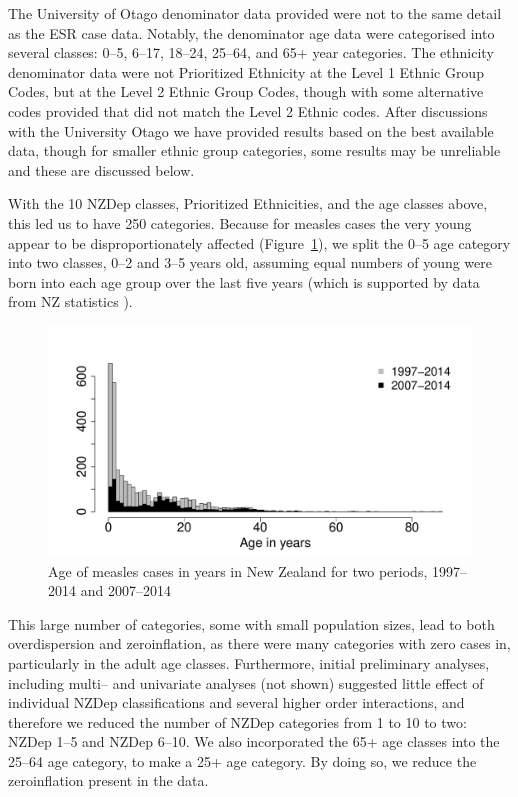 \documentclass{article}
\begin{document}
The University of Otago denominator data provided were not to the same detail as the ESR case data. Notably, the denominator age data were categorised into several classes: 0--5, 6--17, 18--24, 25--64, and 65+ year categories. The ethnicity denominator data were not Prioritized Ethnicity at the Level 1 Ethnic Group Codes, but at the Level 2 Ethnic Group Codes, though with some alternative codes provided that did not match the Level 2 Ethnic codes. After discussions with the University Otago we have provided results based on the best available data, though for smaller ethnic group categories, some results may be unreliable and these are discussed below.

With the 10 NZDep classes, Prioritized Ethnicities, and the age classes above, this led us to have 250 categories. Because for measles cases the very young appear to be disproportionately affected (Figure~\ref{fig:ageinyears}), we split the 0--5 age category into two classes, 0--2 and 3--5 years old, assuming equal numbers of young were born into each age group over the last five years (which is supported by data from NZ statistics \citep{stats14}).


\begin{figure}[h!]
\begin{center}
\includegraphics{interimreport2-002}
\end{center}
\caption{Age of measles cases in years in New Zealand for two periods, 1997--2014 and 2007--2014}
\label{fig:ageinyears}
\end{figure}





This large number of categories, some with small population sizes, lead to both overdispersion and zeroinflation, as there were many categories with zero cases in, particularly in the adult age classes. Furthermore, initial preliminary analyses, including multi-- and univariate analyses (not shown) suggested little effect of individual NZDep classifications and several higher order interactions, and therefore we reduced the number of NZDep categories from 1 to 10 to two: NZDep 1--5 and NZDep 6--10. We also incorporated the 65+ age classes into the 25--64 age category, to make a 25+ age category. By doing so, we reduce the zeroinflation present in the data. 
\end{document}
